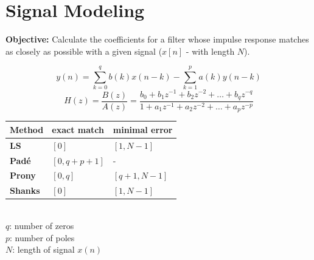 \vspace{1em}
\begin{minipage}[t]{11cm}
  \vspace{-1.7cm}
  \section{Signal Modeling }
  \textbf{Objective: } Calculate the coefficients for a filter whose
  impulse response matches as closely as possible with a given signal ($x[n]$ - with
  length $N$).

      $$ y(n) = \sum\limits_{k=0}^{q} b(k)x(n-k) - \sum\limits_{k=1}^{p} a(k)y(n-k)$$
      $$ H(z) = \dfrac{B(z)}{A(z)} = \dfrac{b_0 + b_1z^{-1} + b_2 z^{-2} + \dots +
      b_q z^{-q}}{1 + a_1z^{-1} + a_2 z^{-2} + \dots + a_p z^{-p}} $$

\end{minipage}
\hfill
\begin{minipage}{7.2cm}
	\vspace{3mm}
	\begin{tabular}{| p{1.4cm} | p{2cm} | p{2.2cm} | }
	    \hline
	    \textbf{Method}
	    & exact match
	    & minimal error \\
	    \hline
	    \hline
	    \textbf{LS}
	    & $[0]$
	    & $[1, N - 1]$\\
	    \hline
	    \textbf{Padé}
	    & $[0, q + p + 1]$
	    & -\\
	    \hline
	    \textbf{Prony}
	    & $[0, q]$
	    & $[q + 1, N - 1]$ \\
	    \hline
	    \textbf{Shanks}
	    & $[0]$
	    & $[1, N - 1]$\\
	    \hline
	\end{tabular}\\
	$q$: number of zeros\\
	$p$: number of poles\\
	$N$: length of signal $x(n)$
\end{minipage}

